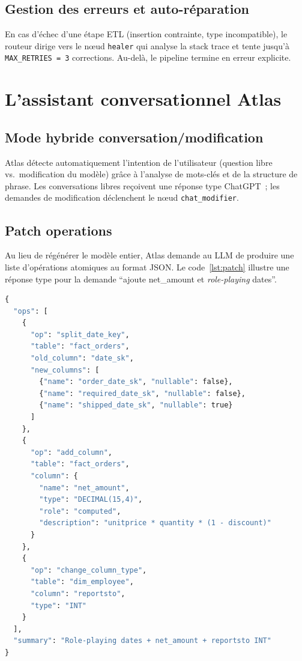 \documentclass[12pt, a4paper]{report}
\begin{document}
\subsection{Gestion des erreurs et auto-réparation}
En cas d'échec d'une étape ETL (insertion contrainte, type incompatible),
le routeur dirige vers le nœud \texttt{healer} qui analyse la stack
trace et tente jusqu'à \texttt{MAX\_RETRIES = 3} corrections. Au-delà,
le pipeline termine en erreur explicite.

\section{L'assistant conversationnel Atlas}

\subsection{Mode hybride conversation/modification}
Atlas détecte automatiquement l'intention de l'utilisateur (question
libre vs.\ modification du modèle) grâce à l'analyse de mots-clés et
de la structure de phrase. Les conversations libres reçoivent une
réponse type ChatGPT~; les demandes de modification déclenchent le
nœud \texttt{chat\_modifier}.

\subsection{Patch operations}
Au lieu de régénérer le modèle entier, Atlas demande au \ac{LLM}
de produire une liste d'opérations atomiques au format \ac{JSON}.
Le code~\ref{lst:patch} illustre une réponse type pour la demande
``ajoute net\_amount et \emph{role-playing} dates''.

\begin{lstlisting}[language=Python, caption={Exemple de patch operations produit par Atlas}, label=lst:patch]
{
  "ops": [
    {
      "op": "split_date_key",
      "table": "fact_orders",
      "old_column": "date_sk",
      "new_columns": [
        {"name": "order_date_sk", "nullable": false},
        {"name": "required_date_sk", "nullable": false},
        {"name": "shipped_date_sk", "nullable": true}
      ]
    },
    {
      "op": "add_column",
      "table": "fact_orders",
      "column": {
        "name": "net_amount",
        "type": "DECIMAL(15,4)",
        "role": "computed",
        "description": "unitprice * quantity * (1 - discount)"
      }
    },
    {
      "op": "change_column_type",
      "table": "dim_employee",
      "column": "reportsto",
      "type": "INT"
    }
  ],
  "summary": "Role-playing dates + net_amount + reportsto INT"
}
\end{lstlisting}
\end{document}
